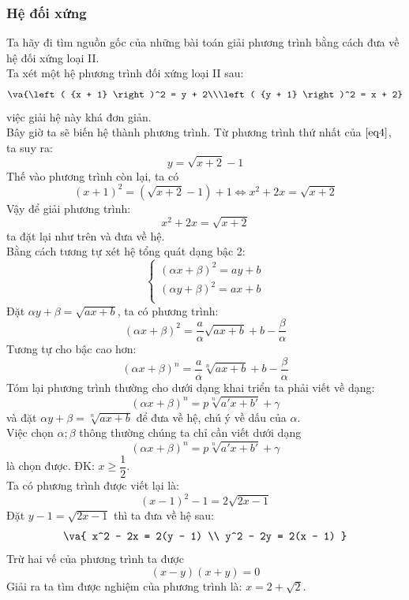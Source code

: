 \subsubsection{Hệ đối xứng}
Ta hãy đi tìm nguồn gốc của những bài toán giải phương trình bằng cách đưa về hệ đối xứng loại II.\\
Ta xét một hệ phương trình đối xứng loại II sau:
\begin{equation} \label{eq4}
\va{\left( {x + 1} \right)^2 = y + 2\\\left( {y + 1} \right)^2 = x + 2}
\end{equation}
việc giải hệ này khá đơn giản.\\
Bây giờ ta sẽ biến hệ thành phương trình. Từ phương trình thứ nhất của $\eqref{eq4}$, ta suy ra:
$$y= \sqrt {x + 2} - 1$$
Thế vào phương trình còn lại, ta có
$$\left( {x + 1} \right)^2 = (\sqrt {x + 2} - 1) + 1 \Leftrightarrow x^2 + 2x = \sqrt {x + 2} $$
Vậy để giải phương trình:  $$x^2 + 2x = \sqrt {x + 2} $$ ta đặt lại như trên và đưa về hệ.\\
Bằng cách tương tự xét hệ tổng quát dạng bậc 2:  
$$\left\{ \begin{array}{l}
 \left( {\alpha x + \beta } \right)^2 = ay + b \\ 
 \left( {\alpha y + \beta } \right)^2 = ax + b \\ 
 \end{array} \right.$$
Đặt $\alpha y + \beta = \sqrt {ax + b} $, ta có phương trình:  $$\left( {\alpha x + \beta } \right)^2 = \dfrac{a}{\alpha }\sqrt {ax + b} + b - \dfrac{\beta }{\alpha }$$
Tương tự cho bậc cao hơn:  $$\left( {\alpha x + \beta } \right)^n = \dfrac{a}{\alpha }\sqrt[n]{{ax + b}} + b - \dfrac{\beta }{\alpha }$$
Tóm lại phương trình thường cho dưới dạng khai triển ta phải viết về dạng: $$\left( {\alpha x + \beta } \right)^n = p\sqrt[n]{{a'x + b'}} + \gamma $$ và đặt $\alpha y + \beta = \sqrt[n]{{ax + b}}$ để đưa về hệ, chú ý về dấu của $\alpha$.\\
Việc chọn $\alpha ;\beta $ thông thường chúng ta chỉ cần viết dưới dạng $$\left( {\alpha x + \beta } \right)^n = p\sqrt[n]{{a'x + b'}} + \gamma $$ là chọn được.
\hda
ĐK: $x \ge \dfrac{1}{2}$.\\
Ta có phương trình được viết lại là: 
$$(x - 1)^2 - 1 = 2\sqrt {2x - 1} $$
Đặt $y - 1 = \sqrt {2x - 1} $ thì ta đưa về hệ sau: 
$$\va{ x^2 - 2x = 2(y - 1) \\ 
 y^2 - 2y = 2(x - 1) }$$
Trừ hai vế của phương trình ta được $$(x - y)(x + y) = 0$$
Giải ra ta tìm được nghiệm của phương trình là: $x = 2 + \sqrt 2 $.
